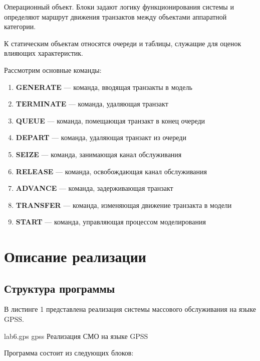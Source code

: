 Операционный объект. Блоки задают логику функционирования системы и определяют маршрут движения транзактов между объектами аппаратной категории.

К статическим объектам относятся очереди и таблицы, служащие для оценок влияющих характеристик.

Рассмотрим основные команды:

\begin{enumerate}
    \item \textbf{GENERATE} — команда, вводящая транзакты в модель
    \item \textbf{TERMINATE} — команда, удаляющая транзакт
    \item \textbf{QUEUE} — команда, помещающая транзакт в конец очереди
    \item \textbf{DEPART} — команда, удаляющая транзакт из очереди
    \item \textbf{SEIZE} — команда, занимающая канал обслуживания
    \item \textbf{RELEASE} — команда, освобождающая канал обслуживания
    \item \textbf{ADVANCE} — команда, задерживающая транзакт
    \item \textbf{TRANSFER} — команда, изменяющая движение транзакта в модели
    \item \textbf{START} — команда, управляющая процессом моделирования
\end{enumerate}

\section{Описание реализации}

\subsection{Структура программы}

В листинге 1 представлена реализация системы массового обслуживания на языке GPSS.

    {lab6.gps}
    {gpss}
    {Реализация СМО на языке GPSS}

Программа состоит из следующих блоков:


